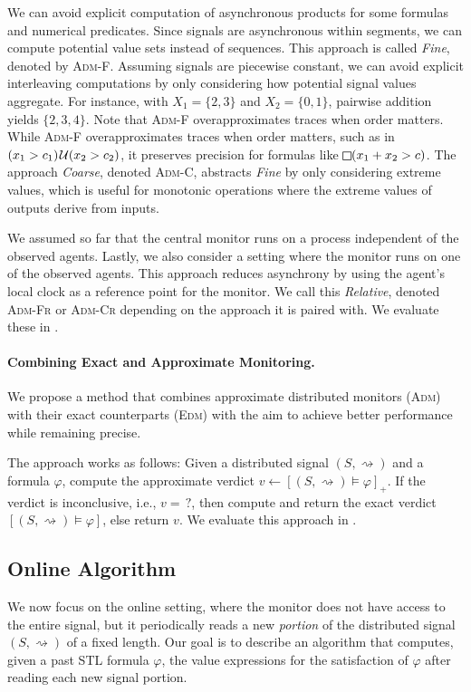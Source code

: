 \documentclass[iicol,lineno]{sn-jnl}
\renewcommand{\cref}{\Cref}
\newcommand{\hb}{\rightsquigarrow}
\renewcommand{\LTLg}{\LTLsquare}
\let\LTLalways\LTLg
\def\until{\kern.1em\mathcal{U}}
\newcommand{\?}{\text{?}}
\begin{document}
	We can avoid explicit computation of asynchronous products for some formulas and numerical predicates.
	Since signals are asynchronous within segments, we can compute potential value sets instead of sequences.
	This approach is called \emph{Fine}, denoted by \textsc{Adm-F}.
	Assuming signals are piecewise constant, we can avoid explicit interleaving computations by only considering how potential signal values aggregate.
	For instance, with $X_1 = \{2,3\}$ and $X_2 = \{0,1\}$, pairwise addition yields $\{2, 3, 4\}$.
	Note that \textsc{Adm-F} overapproximates traces when order matters.
	While \textsc{Adm-F} overapproximates traces when order matters, such as in $(x_1 > c_1) \until (x_2 > c_2)$, it preserves precision for formulas like $\LTLalways(x_1 + x_2 > c)$.
	The approach \emph{Coarse}, denoted \textsc{Adm-C}, abstracts \emph{Fine} by only considering extreme values, which is useful for monotonic operations where the extreme values of outputs derive from inputs.
	
	We assumed so far that the central monitor runs on a process independent of the observed agents.
	Lastly, we also consider a setting where the monitor runs on one of the observed agents.
	This approach reduces asynchrony by using the agent's local clock as a reference point for the monitor.
	We call this \emph{Relative}, denoted \textsc{Adm-Fr} or \textsc{Adm-Cr} depending on the approach it is paired with.
	We evaluate these in \cref{sec:experiments}.
	
	\paragraph*{Combining Exact and Approximate Monitoring.}
	We propose a method that combines approximate distributed monitors (\textsc{Adm}) with their exact counterparts (\textsc{Edm}) with the aim to achieve better performance while remaining precise.
	
	The approach works as follows:
	Given a distributed signal $(S,{\hb})$ and a formula $\varphi$, compute the approximate verdict $v \gets [(S,{\hb}) \models \varphi]_+$.
	If the verdict is inconclusive, i.e., $v = {\,?}$, then compute and return the exact verdict $[(S,{\hb}) \models \varphi]$, else return $v$.
	We evaluate this approach in \cref{sec:experiments}.
	
	\subsection{Online Algorithm}\label{sec:online}
	We now focus on the online setting, where the monitor does not have access to the entire signal, but it periodically reads a new \emph{portion} of the distributed signal $(S,{\hb})$ of a fixed length.
	Our goal is to describe an algorithm that computes, given a past STL formula $\varphi$, the value expressions for the satisfaction of $\varphi$ after reading each new signal portion.
	
\end{document}
